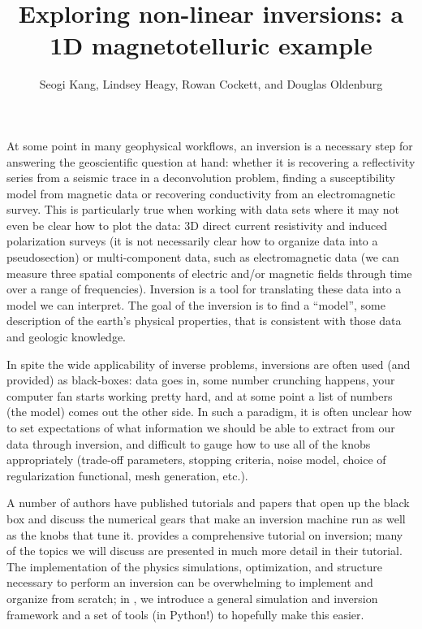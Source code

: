 \documentclass[11pt,oneside]{article}
\begin{document}
\title{Exploring non-linear inversions: a 1D magnetotelluric example}
\author{Seogi Kang, Lindsey Heagy, Rowan Cockett, and Douglas Oldenburg}

\maketitle

At some point in many geophysical workflows, an inversion is a necessary step for answering the geoscientific question at hand: whether it is recovering a reflectivity series from a seismic trace in a deconvolution problem, finding a susceptibility model from magnetic data or recovering conductivity from an electromagnetic survey. This is particularly true when working with data sets where it may not even be clear how to plot the data: 3D direct current resistivity and induced polarization surveys (it is not necessarily clear how to organize data into a pseudosection) or multi-component data, such as electromagnetic data (we can measure three spatial components of electric and/or magnetic fields through time over a range of frequencies). Inversion is a tool for translating these data into a model we can interpret. The goal of the inversion is to find a ``model'', some description of the earth’s physical properties, that is consistent with those data and geologic knowledge.

In spite the wide applicability of inverse problems, inversions are often used (and provided) as black-boxes: data goes in, some number crunching happens, your computer fan starts working pretty hard, and at some point a list of numbers (the model) comes out the other side. In such a paradigm, it is often unclear how to set expectations of what information we should be able to extract from our data through inversion, and difficult to gauge how to use all of the knobs appropriately (trade-off parameters, stopping criteria, noise model, choice of regularization functional, mesh generation, etc.).

A number of authors have published tutorials and papers that open up the black box and discuss the numerical gears that make an inversion machine run as well as the knobs that tune it. \cite{OldenburgTutorial} provides a comprehensive tutorial on inversion; many of the topics we will discuss are presented in much more detail in their tutorial. The implementation of the physics simulations, optimization, and structure necessary to perform an inversion can be overwhelming to implement and organize from scratch; in \citep{SimPEGPaper}, we introduce a general simulation and inversion framework and a set of tools (in Python!) to hopefully make this easier.
\end{document}
